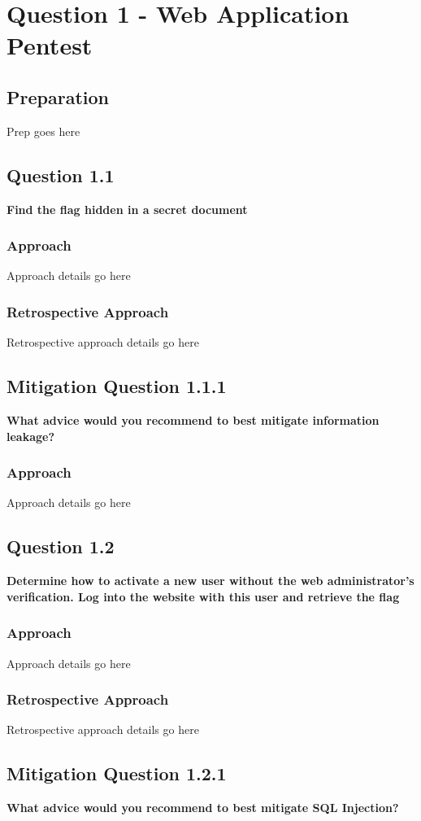 \chapter{Question 1 - Web Application Pentest}

\section{Preparation}
Prep goes here

\section{Question 1.1}
\textbf{Find the flag hidden in a secret document}
\subsection{Approach}
Approach details go here
\subsection{Retrospective Approach}
Retrospective approach details go here

\section{Mitigation Question 1.1.1}
\textbf{What advice would you recommend to best mitigate information leakage?}
\subsection{Approach}
Approach details go here

\section{Question 1.2}
\textbf{Determine how to activate a new user without the web administrator's
verification. Log into the website with this user and retrieve the flag}
\subsection{Approach}
Approach details go here
\subsection{Retrospective Approach}
Retrospective approach details go here

\section{Mitigation Question 1.2.1}
\textbf{What advice would you recommend to best mitigate SQL Injection?}
